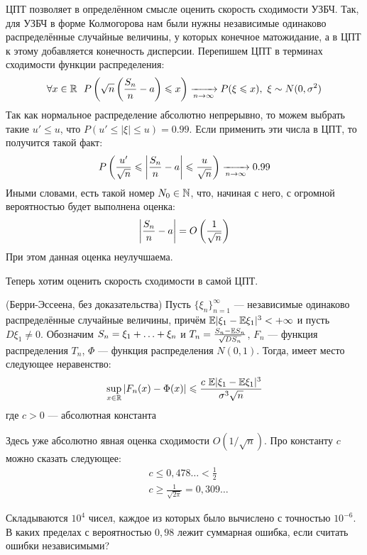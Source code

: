 \begin{note}
    ЦПТ позволяет в определённом смысле оценить скорость сходимости УЗБЧ. Так, для УЗБЧ в форме Колмогорова нам были нужны независимые одинаково распределённые случайные величины, у которых конечное матожидание, а в ЦПТ к этому добавляется конечность дисперсии. Перепишем ЦПТ в терминах сходимости функции распределения:
    \[
    	\forall x \in \mathbb{R}\ \ P\left(\sqrt{n}\left(\frac{S_n}{n} - a\right) \leqslant x\right) \xrightarrow[n \to \infty]{} P(\xi \leqslant x),\ \xi \sim N(0, \sigma^2)
    \]
    Так как нормальное распределение абсолютно непрерывно, то можем выбрать такие $u' \le u$, что $P(u' \le |\xi| \le u) = 0.99$. Если применить эти числа в ЦПТ, то получится такой факт:
    \[
    	P\left(\frac{u'}{\sqrt{n}} \leqslant \left|\frac{S_n}{n} - a\right| \leqslant \frac{u}{\sqrt{n}}\right) \xrightarrow[n \to \infty]{} 0.99
    \]
    Иными словами, есть такой номер $N_0 \in \mathbb{N}$, что, начиная с него, с огромной вероятностью будет выполнена оценка:
    \[
    	\left|\frac{S_n}{n} - a\right| = O\left(\frac{1}{\sqrt{n}}\right)
    \]
    При этом данная оценка неулучшаема.
\end{note}

\begin{note}
    Теперь хотим оценить скорость сходимости в самой ЦПТ.
\end{note}

\begin{theorem} (Берри-Эссеена, без доказательства)
    Пусть $\{\xi_n\}_{n = 1}^\infty$ --- независимые одинаково распределённые случайные величины, причём $\mathbb{E}|\xi_1-\mathbb{E}\xi_1|^3 < +\infty$ и пусть $D\xi_1 \neq 0$. Обозначим $S_n = \xi_1 + \ldots + \xi_n$ и $T_n = \frac{S_n - \mathbb{E} S_n}{\sqrt{DS_n}}$, $F_n$ --- функция распределения $T_n$, $\Phi$ --- функция распределения $N(0, 1)$. Тогда, имеет место следующее неравенство:
    \[
        \sup_{x \in \R} |F_n(x)-\Phi(x)| \le \frac{c \ \E|\xi_1-\E\xi_1|^3}{\sigma^3 \sqrt{n}}
    \]
    где $c > 0$ --- абсолютная константа
\end{theorem}

\begin{note}
    Здесь уже абсолютно явная оценка сходимости $O(1 / \sqrt{n})$. Про константу $c$ можно сказать следующее:
    \begin{align*}
    & c \le 0,478\ldots < \frac{1}{2}
    \\
    & c \ge \frac{1}{\sqrt{2\pi}} = 0,309\ldots
    \end{align*}
\end{note}

\begin{example}
    Складываются $10^4$ чисел, каждое из которых было вычислено с точностью $10^{-6}$. В каких пределах с вероятностью $0,98$ лежит суммарная ошибка, если считать ошибки независимыми?
\end{example}

